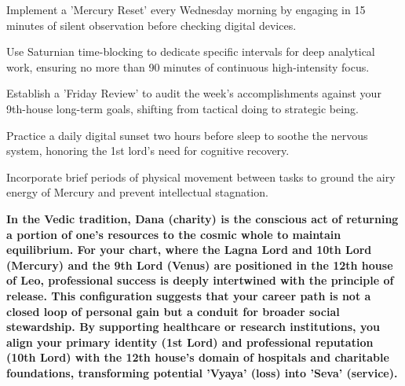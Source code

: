 \begin{diamondlist}
  \item {\fontsize{8.5}{12}\selectfont Implement a 'Mercury Reset' every Wednesday morning by engaging in 15 minutes of silent observation before checking digital devices.}
  \item {\fontsize{8.5}{12}\selectfont Use Saturnian time-blocking to dedicate specific intervals for deep analytical work, ensuring no more than 90 minutes of continuous high-intensity focus.}
  \item {\fontsize{8.5}{12}\selectfont Establish a 'Friday Review' to audit the week's accomplishments against your 9th-house long-term goals, shifting from tactical doing to strategic being.}
  \item {\fontsize{8.5}{12}\selectfont Practice a daily digital sunset two hours before sleep to soothe the nervous system, honoring the 1st lord's need for cognitive recovery.}
  \item {\fontsize{8.5}{12}\selectfont Incorporate brief periods of physical movement between tasks to ground the airy energy of Mercury and prevent intellectual stagnation.}
\end{diamondlist}


\label{topic64}

{\fontsize{9.5}{13.8}\selectfont\bfseries\color{DeepSlate} In the Vedic tradition, Dana (charity) is the conscious act of returning a portion of one's resources to the cosmic whole to maintain equilibrium. For your chart, where the Lagna Lord and 10th Lord (Mercury) and the 9th Lord (Venus) are positioned in the 12th house of Leo, professional success is deeply intertwined with the principle of release. This configuration suggests that your career path is not a closed loop of personal gain but a conduit for broader social stewardship. By supporting healthcare or research institutions, you align your primary identity (1st Lord) and professional reputation (10th Lord) with the 12th house's domain of hospitals and charitable foundations, transforming potential 'Vyaya' (loss) into 'Seva' (service).}\par\vspace{2mm}

